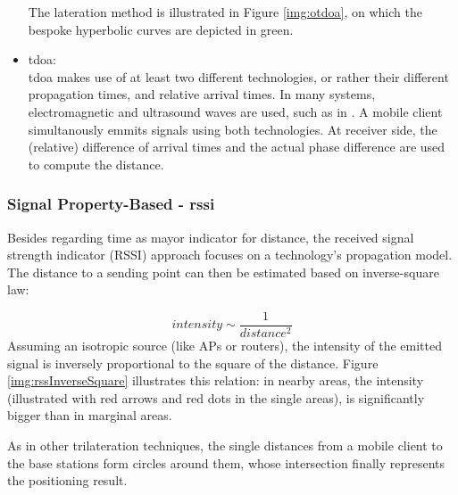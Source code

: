 \begin{itemize}
	The lateration method is illustrated in Figure \ref{img:otdoa}, on which the bespoke hyperbolic curves are depicted in green.
	
	\item \ac{tdoa}:\\
	\ac{tdoa} makes use of at least two different technologies, or rather their different propagation times, and relative arrival times. In many systems, electromagnetic and ultrasound waves are used, such as in \cite{otoaUltrasound}. A mobile client simultanously emmits signals using both technologies. At receiver side, the (relative) difference of arrival times and the actual phase difference are used to compute the distance. \cite{mitILSystem}
\end{itemize}

\subsubsection{Signal Property-Based - \ac{rssi}}

Besides regarding time as mayor indicator for distance, the received signal strength indicator (RSSI) approach focuses on a technology's propagation model. The distance to a sending point can then be estimated based on inverse-square law:

\[intensity \sim \frac{1}{distance^{2}}\]
Assuming an isotropic source (like APs or routers), the intensity of the emitted signal is inversely proportional to the square of the distance. Figure \ref{img:rssInverseSquare} illustrates this relation: in nearby areas, the intensity (illustrated with red arrows and red dots in the single areas), is significantly bigger than in marginal areas.	


As in other trilateration techniques, the single distances from a mobile client to the base stations form circles around them, whose intersection finally represents the positioning result.




